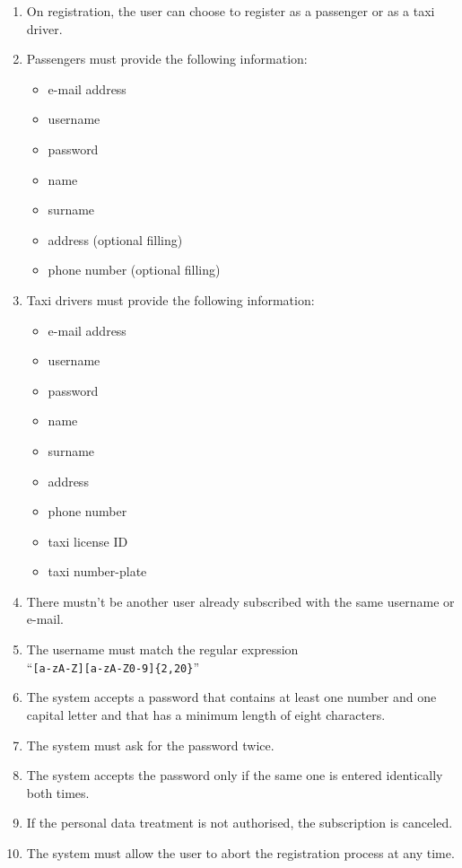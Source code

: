 \begin{enumerate}
    \item On registration, the user can choose to register as a passenger or as a taxi driver.
    \item Passengers must provide the following information:
    \begin{itemize}
        \item e-mail address
        \item username 
        \item password
        \item name
        \item surname
        \item address (optional filling)
        \item phone number (optional filling)
    \end{itemize}
    \item Taxi drivers must provide the following information:
    \begin{itemize}
        \item e-mail address
        \item username 
        \item password
        \item name
        \item surname
        \item address 
        \item phone number
        \item taxi license ID
        \item taxi number-plate
    \end{itemize}
    \item There mustn't be another user already subscribed with the same username or e-mail.
    \item The username must match the regular expression\\``\texttt{[a-zA-Z][a-zA-Z0-9]\{2,20\}}''
    \item The system accepts a password that contains at least one number and one capital letter and that has a minimum length of eight characters.
    \item The system must ask for the password twice.
    \item The system accepts the password only if the same one is entered identically both times.
    \item If the personal data treatment is not authorised, the subscription is canceled.
    \item The system must allow the user to abort the registration process at any time.

\end{enumerate}
